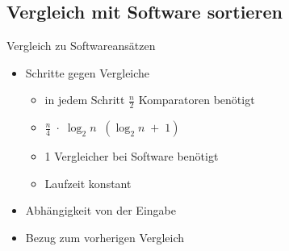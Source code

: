 \documentclass[ucs,9pt]{beamer}
\begin{document}
% 
\subsection{Vergleich mit Software sortieren}
\begin{frame}{Vergleich zu Softwareansätzen}
	\begin{itemize}
		\item Schritte gegen Vergleiche
			\begin{itemize}
				\item in jedem Schritt $\frac{n}{2}$ Komparatoren benötigt 
				\item[] $\frac{n}{4}\; \cdot\;\log_2 n \;\; (\log_2 n\;+\;1)$ 
				\item 1 Vergleicher bei Software benötigt
				\item Laufzeit konstant
			\end{itemize}
	 	\item Abhängigkeit von der Eingabe
	 	\item Bezug zum vorherigen Vergleich
	\end{itemize}
\end{frame}

\end{document}
